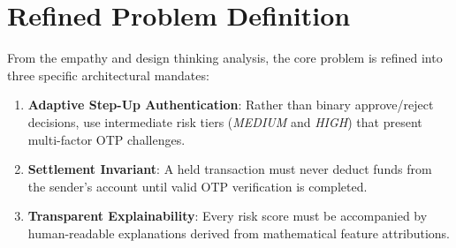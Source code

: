 \section{Refined Problem Definition}
From the empathy and design thinking analysis, the core problem is refined into three specific architectural mandates:
\begin{enumerate}[label=\arabic*.]
    \item \textbf{Adaptive Step-Up Authentication}: Rather than binary approve/reject decisions, use intermediate risk tiers (\textit{MEDIUM} and \textit{HIGH}) that present multi-factor OTP challenges.
    \item \textbf{Settlement Invariant}: A held transaction must never deduct funds from the sender's account until valid OTP verification is completed.
    \item \textbf{Transparent Explainability}: Every risk score must be accompanied by human-readable explanations derived from mathematical feature attributions.
\end{enumerate}
